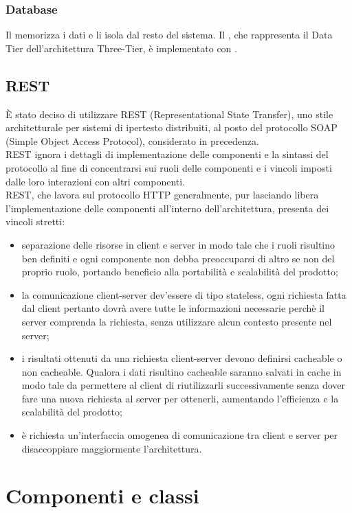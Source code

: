 \documentclass[a4paper, titlepage]{article}
\begin{document}
	\subsubsection{Database}
	Il  memorizza i dati e li isola dal resto del sistema. Il , che rappresenta il Data Tier dell'architettura Three-Tier, è implementato con . 
	
	\subsection{REST}
	È stato deciso di utilizzare REST (Representational State Transfer), uno stile architetturale per sistemi di ipertesto distribuiti, al posto del protocollo SOAP (Simple Object Access Protocol), considerato in precedenza.
	\\ REST ignora i dettagli di implementazione delle componenti e la sintassi del protocollo al fine di concentrarsi sui ruoli delle componenti e i vincoli imposti dalle loro interazioni con altri componenti.
	\\ REST, che lavora sul protocollo HTTP generalmente, pur lasciando libera l'implementazione delle componenti all'interno dell'architettura, presenta dei vincoli stretti:
	\begin{itemize}
	\item separazione delle risorse in client e server in modo tale che i ruoli risultino ben definiti e ogni componente non debba preoccuparsi di altro se non del proprio ruolo, portando beneficio alla portabilità e scalabilità del prodotto;
	\item la comunicazione client-server dev'essere di tipo stateless, ogni richiesta fatta dal client pertanto dovrà avere tutte le informazioni necessarie perchè il server comprenda la richiesta, senza utilizzare alcun contesto presente nel server;
	\item i risultati ottenuti da una richiesta client-server devono definirsi cacheable o non cacheable. Qualora i dati risultino cacheable saranno salvati in cache in modo tale da permettere al client di riutilizzarli successivamente senza dover fare una nuova richiesta al server per ottenerli, aumentando l'efficienza e la scalabilità del prodotto;
	\item è richiesta un'interfaccia omogenea di comunicazione tra client e server per disaccoppiare maggiormente l'architettura.
	\end{itemize}
\newpage

\section{Componenti e classi}

\end{document}
